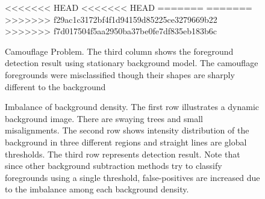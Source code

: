 \documentclass[conference]{IEEEtran}
\begin{document}
\begin{figure}[!t]
  \centering
<<<<<<< HEAD
  \label{fig10}
<<<<<<< HEAD
  \hfill
  \hfill
=======
=======
  \label{fig:10}
>>>>>>> f29ac1c3172bf4f1d94159d85225ce3279669b22
  \hfill
  \hfill
>>>>>>> f7d017504f5aa2950ba37be0fe7df835eb183b6c
  \caption{Camouflage Problem. The third column shows the foreground detection result using stationary background model. The camouflage foregrounds were misclassified though their shapes are sharply different to the background}
\end{figure}

\begin{figure}[!t]
  \centering
  \label{fig:20}
  \hfill
  \caption{Imbalance of background density. The first row illustrates a dynamic background image. There are swaying trees and small misalignments. The second row shows intensity distribution of the background in three different regions and straight lines are global thresholds. The third row represents detection result. Note that since other background subtraction methods try to classify foregrounds using a single threshold, false-positives are increased due to the imbalance among each background density.}
\end{figure}
\end{document}
